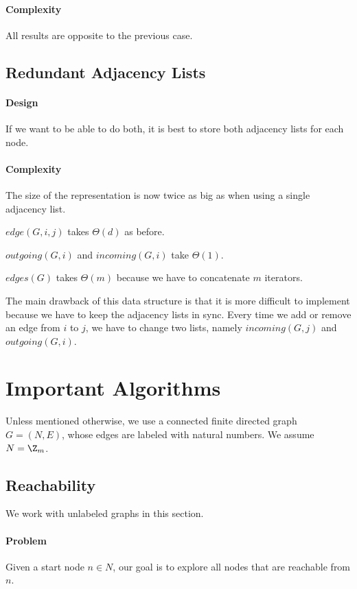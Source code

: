 \paragraph{Complexity}
All results are opposite to the previous case.

\subsection{Redundant Adjacency Lists}

\paragraph{Design}

If we want to be able to do both, it is best to store both adjacency lists for each node.

\paragraph{Complexity}
The size of the representation is now twice as big as when using a single adjacency list.

$edge(G,i,j)$ takes $\Theta(d)$ as before.

$outgoing(G,i)$ and $incoming(G,i)$ take $\Theta(1)$.

$edges(G)$ takes $\Theta(m)$ because we have to concatenate $m$ iterators.

The main drawback of this data structure is that it is more difficult to implement because we have to keep the adjacency lists in sync.
Every time we add or remove an edge from $i$ to $j$, we have to change two lists, namely $incoming(G,j)$ and $outgoing(G,i)$.

\section{Important Algorithms}

Unless mentioned otherwise, we use a connected finite directed graph $G=(N,E)$, whose edges are labeled with natural numbers.
We assume $N=\Z_m$.

\subsection{Reachability}\label{sec:ad:reachability}

We work with unlabeled graphs in this section.

\paragraph{Problem}
Given a start node $n\in N$, our goal is to explore all nodes that are reachable from $n$.

